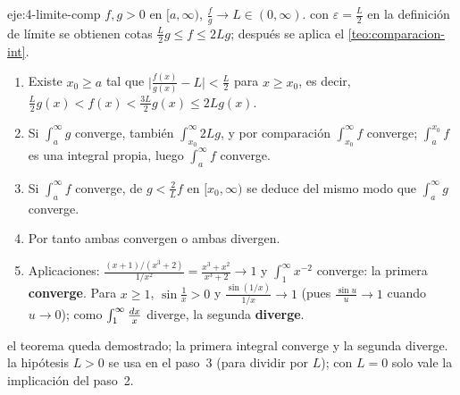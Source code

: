 \begin{solucion}{eje:4-limite-comp}
\datos $f,g>0$ en $[a,\infty)$, $\frac fg\to L\in(0,\infty)$.
\planteamiento con $\varepsilon=\frac L2$ en la definición de límite se obtienen cotas $\frac L2g\le f\le2Lg$; después se aplica el \cref{teo:comparacion-int}.
\pasos
\begin{enumerate}[label=\arabic*.]
  \item Existe $x_0\ge a$ tal que $\bigl|\frac{f(x)}{g(x)}-L\bigr|<\frac L2$ para $x\ge x_0$, es decir, $\frac L2g(x)<f(x)<\frac{3L}{2}g(x)\le2Lg(x)$.
  \item Si $\int_a^{\infty}g$ converge, también $\int_{x_0}^{\infty}2Lg$, y por comparación $\int_{x_0}^{\infty}f$ converge; $\int_a^{x_0}f$ es una integral propia, luego $\int_a^{\infty}f$ converge.
  \item Si $\int_a^{\infty}f$ converge, de $g<\frac2Lf$ en $[x_0,\infty)$ se deduce del mismo modo que $\int_a^{\infty}g$ converge.
  \item Por tanto ambas convergen o ambas divergen.
  \item Aplicaciones: $\frac{(x+1)/(x^{3}+2)}{1/x^{2}}=\frac{x^{3}+x^{2}}{x^{3}+2}\to1$ y $\int_1^{\infty}x^{-2}$ converge: la primera \textbf{converge}. Para $x\ge1$, $\sin\frac1x>0$ y $\frac{\sin(1/x)}{1/x}\to1$ (pues $\frac{\sin u}{u}\to1$ cuando $u\to0$); como $\int_1^{\infty}\frac{\mathop{}\!d x}{x}$ diverge, la segunda \textbf{diverge}.
\end{enumerate}
\resultado el teorema queda demostrado; la primera integral converge y la segunda diverge.
\comprobacion la hipótesis $L>0$ se usa en el paso~3 (para dividir por $L$); con $L=0$ solo vale la implicación del paso~2.
\end{solucion}

